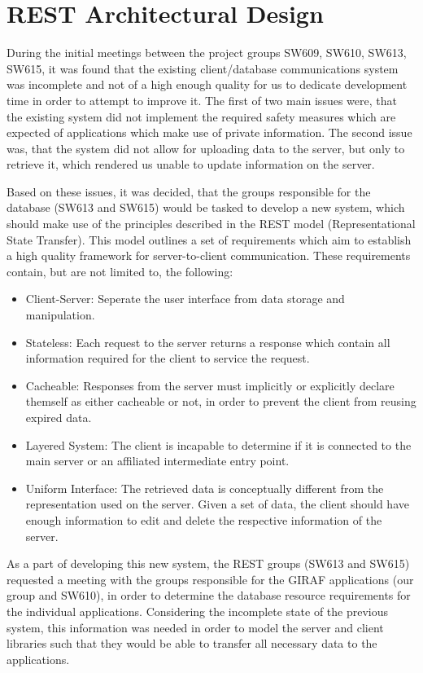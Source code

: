 \chapter{REST Architectural Design}\label{S1CS}
During the initial meetings between the project groups SW609, SW610, SW613,
SW615, it was found that the existing client/database communications system was
incomplete and not of a high enough quality for us to dedicate development time
in order to attempt to improve it. The first of two main issues were, that the
existing system did not implement the required safety measures which are expected of
applications which make use of private information. The second issue was, that
the system did not allow for uploading data to the server, but only to
retrieve it, which rendered us unable to update information on the server.\nl

Based on these issues, it was decided, that the groups responsible for the
database (SW613 and SW615) would be tasked to develop a new system, which should
make use of the principles described in the REST model (Representational State
Transfer)\citep{RESTInfo}. This model outlines a set of requirements which aim
to establish a high quality framework for server-to-client communication. These
requirements contain, but are not limited to, the following:

\begin{itemize}
  \item Client-Server: Seperate the user interface from data storage and
  manipulation.
  \item Stateless: Each request to the server returns a response which contain
  all information required for the client to service the request.
  \item Cacheable: Responses from the server must implicitly or explicitly
  declare themself as either cacheable or not, in order to prevent the client
  from reusing expired data.
  \item Layered System: The client is incapable to determine if it is connected
  to the main server or an affiliated intermediate entry point.
  \item Uniform Interface: The retrieved data is conceptually different from the
  representation used on the server. Given a set of data, the client should have
  enough information to edit and delete the respective information of the
  server. 
\end{itemize}

As a part of developing this new system, the REST groups (SW613 and SW615)
requested a meeting with the groups responsible for the GIRAF applications
(our group and SW610), in order to determine the database resource requirements
for the individual applications. Considering the incomplete state of the previous
system, this information was needed in order to model the server and client
libraries such that they would be able to transfer all necessary data to the
applications.\nl

